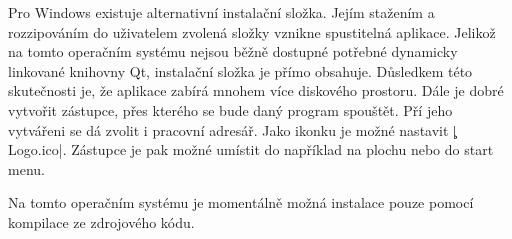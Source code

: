 Pro Windows existuje alternativní instalační složka. Jejím stažením a rozzipováním do uživatelem zvolená složky vznikne spustitelná aplikace. 
Jelikož na tomto operačním systému nejsou běžně dostupné potřebné dynamicky linkované knihovny Qt,
instalační složka je přímo obsahuje.
Důsledkem této skutečnosti je, že aplikace zabírá mnohem více diskového prostoru.
Dále je dobré vytvořit zástupce, přes kterého se bude daný program spouštět.
Pří jeho vytvářeni se dá zvolit i pracovní adresář.
Jako ikonku je možné nastavit \c|Logo.ico|.
Zástupce je pak možné umístit do například na plochu nebo do start menu.

Na tomto operačním systému je momentálně možná instalace pouze pomocí kompilace ze zdrojového kódu.


